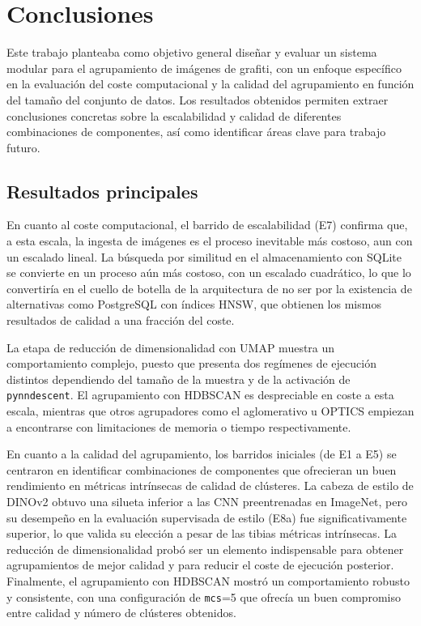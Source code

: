 \section{Conclusiones}
\label{sec:conclusion}

Este trabajo planteaba como objetivo general diseñar y evaluar un sistema
modular para el agrupamiento de imágenes de grafiti, con un enfoque específico
en la evaluación del coste computacional y la calidad del agrupamiento en
función del tamaño del conjunto de datos. Los resultados obtenidos permiten
extraer conclusiones concretas sobre la escalabilidad y calidad de diferentes
combinaciones de componentes, así como identificar áreas clave para trabajo
futuro.

\subsection{Resultados principales}
\label{sec:main-results}

En cuanto al coste computacional, el barrido de escalabilidad (E7) confirma
que, a esta escala, la ingesta de imágenes es el proceso inevitable más
costoso, aun con un escalado lineal. La búsqueda por similitud en el
almacenamiento con SQLite se convierte en un proceso aún más costoso, con un
escalado cuadrático, lo que lo convertiría en el cuello de botella de la
arquitectura de no ser por la existencia de alternativas como PostgreSQL con
índices HNSW, que obtienen los mismos resultados de calidad a una fracción del
coste.

La etapa de reducción de dimensionalidad con UMAP muestra un comportamiento 
complejo, puesto que presenta dos regímenes de ejecución distintos dependiendo
del tamaño de la muestra y de la activación de \texttt{pynndescent}. El
agrupamiento con HDBSCAN es despreciable en coste a esta escala, mientras que
otros agrupadores como el aglomerativo u OPTICS empiezan a encontrarse con
limitaciones de memoria o tiempo respectivamente.

En cuanto a la calidad del agrupamiento, los barridos iniciales (de E1 a E5) se
centraron en identificar combinaciones de componentes que ofrecieran un buen
rendimiento en métricas intrínsecas de calidad de clústeres. La cabeza de
estilo de DINOv2 obtuvo una silueta inferior a las CNN preentrenadas en
ImageNet, pero su desempeño en la evaluación supervisada de estilo (E8a) fue
significativamente superior, lo que valida su elección a pesar de las tibias 
métricas intrínsecas. La reducción de dimensionalidad probó ser un elemento
indispensable para obtener agrupamientos de mejor calidad y para reducir el
coste de ejecución posterior. Finalmente, el agrupamiento con HDBSCAN mostró un
comportamiento robusto y consistente, con una configuración de \texttt{mcs}=5
que ofrecía un buen compromiso entre calidad y número de clústeres obtenidos.

